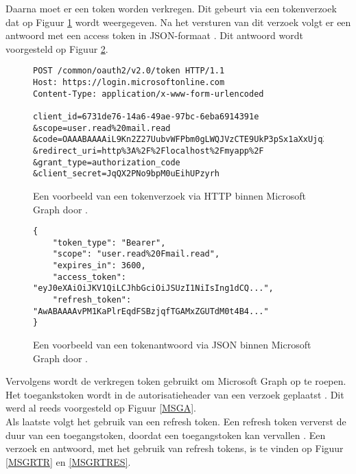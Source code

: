 Daarna moet er een token worden verkregen. Dit gebeurt via een tokenverzoek dat op Figuur \ref{HTR} wordt weergegeven. Na het versturen van dit verzoek volgt er een antwoord met een access token in \ac{JSON}-formaat \autocite{Microsoft2023r}. Dit antwoord wordt voorgesteld op Figuur \ref{HTRES}. \\ 

\begin{figure}[!h]
    \scriptsize
    \begin{verbatim}
POST /common/oauth2/v2.0/token HTTP/1.1
Host: https://login.microsoftonline.com
Content-Type: application/x-www-form-urlencoded
        
client_id=6731de76-14a6-49ae-97bc-6eba6914391e
&scope=user.read%20mail.read
&code=OAAABAAAAiL9Kn2Z27UubvWFPbm0gLWQJVzCTE9UkP3pSx1aXxUjq3n8b2JRLk4OxVXr...
&redirect_uri=http%3A%2F%2Flocalhost%2Fmyapp%2F
&grant_type=authorization_code
&client_secret=JqQX2PNo9bpM0uEihUPzyrh
    \end{verbatim}
    \caption[Voorbeeld User Token Request Microsoft Graph]{Een voorbeeld van een tokenverzoek via \ac{HTTP} binnen Microsoft Graph door \textcite{Microsoft2023r}.}
    \label{HTR}
\end{figure}

\begin{figure}[!h]
    \scriptsize
    \begin{verbatim}
{
    "token_type": "Bearer",
    "scope": "user.read%20Fmail.read",
    "expires_in": 3600,
    "access_token": "eyJ0eXAiOiJKV1QiLCJhbGciOiJSUzI1NiIsIng1dCQ...",
    "refresh_token": "AwABAAAAvPM1KaPlrEqdFSBzjqfTGAMxZGUTdM0t4B4..."
}        
    \end{verbatim}    
    \caption[Voorbeeld User Token Response Microsoft Graph]{Een voorbeeld van een tokenantwoord via \ac{JSON} binnen Microsoft Graph door \textcite{Microsoft2023r}.}
    \label{HTRES}
\end{figure}

Vervolgens wordt de verkregen token gebruikt om Microsoft Graph op te roepen. Het toegankstoken wordt in de autorisatieheader van een verzoek geplaatst \autocite{Microsoft2023r}. Dit werd al reeds voorgesteld op Figuur \ref{MSGA}. \\

Als laatste volgt het gebruik van een refresh token. Een refresh token ververst de duur van een toegangstoken, doordat een toegangstoken kan vervallen \autocite{Microsoft2023r}. Een verzoek en antwoord, met het gebruik van refresh tokens, is te vinden op Figuur \ref{MSGRTR} en \ref{MSGRTRES}.

